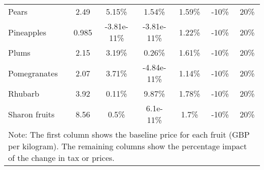 \documentclass[11pt]{article}
\begin{document}
\begin{table}[h]
\begin{center}
{\begin{tabular}{lcccccc}
Pears &2.49 &5.15\% &1.54\% &1.59\% &-10\% &20\% \\
Pineapples &0.985 &-3.81e-11\% &-3.81e-11\% &1.22\% &-10\% &20\% \\
Plums &2.15 &3.19\% &0.26\% &1.61\% &-10\% &20\% \\
Pomegranates &2.07 &3.71\% &-4.84e-11\% &1.14\% &-10\% &20\% \\
\hline
Rhubarb &3.92 &0.11\% &9.87\% &1.78\% &-10\% &20\% \\
Sharon fruits &8.56 &0.5\% &6.1e-11\% &1.7\% &-10\% &20\% \\
 \hline \hline
\multicolumn{7}{p{0.8 \textwidth}}{Note: The first column shows the baseline price for each fruit (GBP per kilogram). The remaining columns show the percentage impact of the change in tax or prices.}
\end{tabular}}
\end{center}
\end{table}
\end{document}
